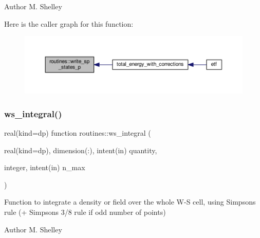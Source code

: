 \begin{DoxyAuthor}{Author}
M. Shelley 
\end{DoxyAuthor}
Here is the caller graph for this function\+:
\nopagebreak
\begin{figure}[H]
\begin{center}
\leavevmode
\includegraphics[width=350pt]{namespaceroutines_ad51ac6c5da6056a5346d7b15b3fbe7b4_icgraph}
\end{center}
\end{figure}
\mbox{\label{namespaceroutines_a5737b4327dcaa959a9ee519e4fca42e8}} 
\subsubsection{\texorpdfstring{ws\+\_\+integral()}{ws\_integral()}}
{\footnotesize\ttfamily real(kind=dp) function routines\+::ws\+\_\+integral (\begin{DoxyParamCaption}\item[{real(kind=dp), dimension(\+:), intent(in)}]{quantity,  }\item[{integer, intent(in)}]{n\+\_\+max }\end{DoxyParamCaption})}



Function to integrate a density or field over the whole W-\/S cell, using Simpson\textquotesingle{}s rule (+ Simpson\textquotesingle{}s 3/8 rule if odd number of points) 

\begin{DoxyAuthor}{Author}
M. Shelley 
\end{DoxyAuthor}

